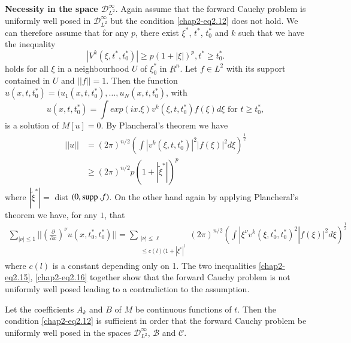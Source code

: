 \smallskip
\noindent
\textbf{Necessity in the space $\mathscr{D}^\infty _{L^2}$}. Again
assume that the forward Cauchy problem is uniformly well posed in 
$\mathscr{D}^\infty_{L^2}$ but the condition \eqref{chap2-eq2.12} 
does not hold. We
can therefore assume that for any $p$,  there exist $\xi^*$, $t^*$,
$t^*_0$ and $k$ such that we have the inequality  
$$
|V^k (\xi, t^*, t^*_0) | \geq p (1+ |\xi| )^p ,  t^* \geq t^*_0.  
$$
holds for all $\xi$ in a neighbourhood $U$ of $\xi_0^*$ in
$\underbar{R}^n$. Let $f \in L^2$ with its support contained in $U$ 
and $|| f || =1$. Then the function $u (x, t, t^*_0) = (u_1 (x, t,
t^*_0),  \ldots , u_N (x, t, t^*_0)$,  with  
\begin{equation}
u(x, t, t^*_0) = \int exp (ix. \xi ) v^k (\xi ,  t, t_0^*) f (\xi )
d\xi \text{ for } t \geq t^*_0,  \tag{2.14}\label{chap2-eq2.14}   
\end{equation}
is a solution of $M[ u ] = 0$. By Plancheral's theorem we have  
\begin{align*}
|| u ||  &= (2 \pi )^{n/2} (\int |v^k(\xi , t, t_0^*) |^2 |f (\xi)|^2
d \xi )^{\frac{1}{2}}\\   
& \geq (2\pi)^{n/2} p(1 +| \tilde{\xi}^*| )^p\tag{2.15}\label{chap2-eq2.15}  
\end{align*}
where $| \tilde{\xi}^*| =$ dist $(0, \operatorname{supp}. f)$. On the other hand
again by applying Plancheral's theorem we have,  for any $1$, that  
\begin{gather*}
\sum\limits_{| \nu | \leq 1} || \left(\frac{\partial}{\partial
  x}\right)^\nu u (x,t^*_0, t^*_0)|| = \sum\limits_{\substack{| \nu |
    \leq \ell\\ \leq c(l)(1+|\xi^*|^l}}(2\pi )^{n/2} \left( \int|
\xi^\nu v^k (\xi, t^*_0, t^*_0)^2 |f (\xi) |^2d\xi\right)^{\frac{1}{2}}
\tag{2.16}\label{chap2-eq2.16}  
\end{gather*}\pageoriginale
where $c(l)$ is a constant depending only on 1. The two inequalities
\eqref{chap2-eq2.15}, \eqref{chap2-eq2.16} 
together show that the forward Cauchy problem is
not uniformly well posed leading to a contradiction to the assumption.  

\begin{proposition}[Petrowsky]\label{chap2-sec2-prop3}%
 Let the coefficients $A_k$ and $B$ of $M$ be continuous functions of
 $t$. Then the condition \eqref{chap2-eq2.12} is sufficient in order that the
 forward Cauchy problem be uniformly well posed in the spaces $
 \mathscr{D}^\infty _{L^2}$, $\mathscr{B}$ and $ \mathscr{C}$. 
\end{proposition}

